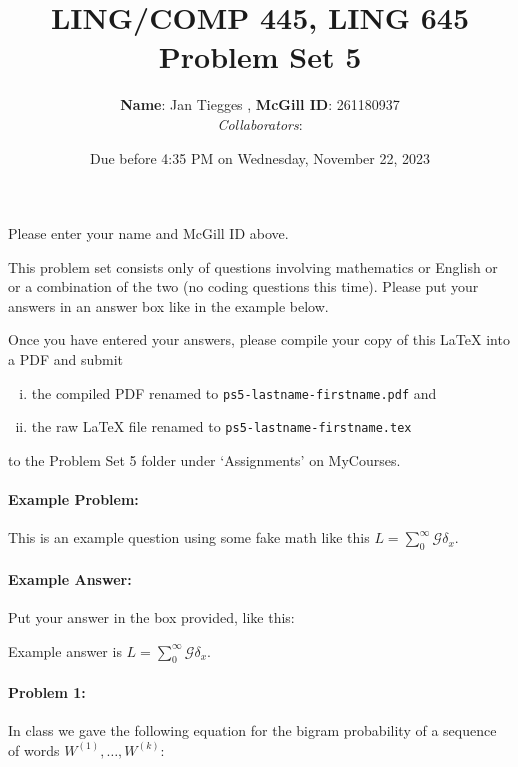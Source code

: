 \documentclass[10pt]{article}
\author{
  \textbf{Name}: Jan Tiegges       %
, \textbf{McGill ID}: 261180937 %
\\ \textit{Collaborators}:  %
}
\newenvironment{AnswerBox}{\begin{mdframed}[style=simple]}{\end{mdframed}}
\newcommand{\PSnum}{5}
\begin{document}
\title{LING/COMP 445, LING 645\\Problem Set \PSnum}
\date{Due before 4:35 PM on Wednesday, November 22, 2023}
\maketitle
Please enter your name and McGill ID above.

This problem set consists only of questions involving mathematics or
English or or a combination of the two (no coding questions this time).
Please put your answers in an answer box like in the example below.

Once you have entered your answers, please compile your copy of this
\LaTeX{} into a PDF and submit 
\begin{enumerate}[(i),noitemsep]
\item
the compiled PDF renamed to
\texttt{ps\PSnum-lastname-firstname.pdf} and
\item
the raw \LaTeX{} file renamed to
\texttt{ps\PSnum-lastname-firstname.tex}
\end{enumerate}
to the Problem Set \PSnum{} folder under `Assignments' on MyCourses.


\hrulefill %

\paragraph{Example Problem:}
This is an example question using some fake math like this
$L=\sum_0^{\infty} \mathcal{G} \delta_x$.

\paragraph{Example Answer:} Put your answer in the box provided, like this:
\begin{AnswerBox}
Example answer is $L=\sum_0^{\infty} \mathcal{G} \delta_x$.
\end{AnswerBox}


\hrulefill%

\pagebreak%

\hrulefill %

\paragraph{Problem 1:}
 
In class we gave the following equation for the bigram probability of
a sequence of words $W^{(1)},\dots,W^{(k)}$:
\end{document}
